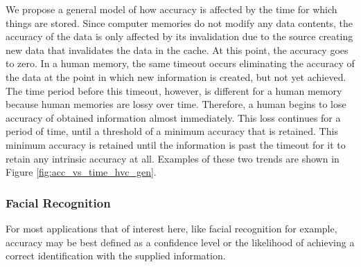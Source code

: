 We propose a general model of how accuracy is affected by the time for which things are stored.  Since computer memories do not modify any data contents, the accuracy of the data is only affected by its invalidation due to the source creating new data that invalidates the data in the cache.  At this point, the accuracy goes to zero.  In a human memory, the same timeout occurs eliminating the accuracy of the data at the point in which new information is created, but not yet achieved.  The time period before this timeout, however, is different for a human memory because human memories are lossy over time.  Therefore, a human begins to lose accuracy of obtained information almost immediately.  This loss continues for a period of time, until a threshold of a minimum accuracy that is retained.  This minimum accuracy is retained until the information is past the timeout for it to retain any intrinsic accuracy at all.  Examples of these two trends are shown in Figure \ref{fig:acc_vs_time_hvc_gen}.

\subsubsection{Facial Recognition}

For most applications that of interest here, like facial recognition for example, accuracy may be best defined as a confidence level or the likelihood of achieving a correct identification with the supplied information.  

